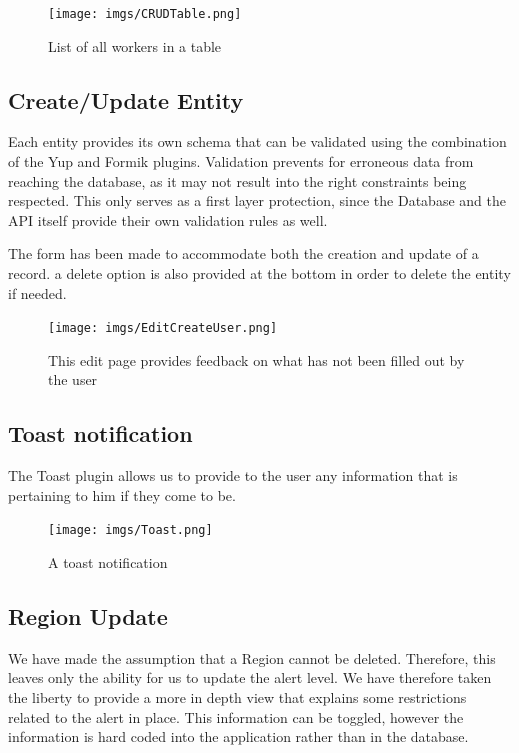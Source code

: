 \documentclass{article}
\begin{document}
\begin{figure}[H]
    \centering
    \texttt{[image: imgs/CRUDTable.png]}
    \caption{List of all workers in a table}
\end{figure}

\subsection{Create/Update Entity}

Each entity provides its own schema that can be validated using the combination of the Yup and Formik plugins. Validation prevents for erroneous data from reaching the database, as it may not result into the right constraints being respected. This only serves as a first layer protection, since the Database and the API itself provide their own validation rules as well.

The form has been made to accommodate both the creation and update of a record. a delete option is also provided at the bottom in order to delete the entity if needed.

\begin{figure}[H]
    \centering
    \texttt{[image: imgs/EditCreateUser.png]}
    \caption{This edit page provides feedback on what has not been filled out by the user}
\end{figure}

\subsection{Toast notification}

The Toast plugin allows us to provide to the user any information that is pertaining to him if they come to be.


\begin{figure}[H]
    \centering
    \texttt{[image: imgs/Toast.png]}
    \caption{A toast notification}
\end{figure}


\subsection{Region Update}

We have made the assumption that a Region cannot be deleted. Therefore, this leaves only the ability for us to update the alert level. We have therefore taken the liberty to provide a more in depth view that explains some restrictions related to the alert in place. This information can be toggled, however the information is hard coded into the application rather than in the database.
\end{document}
